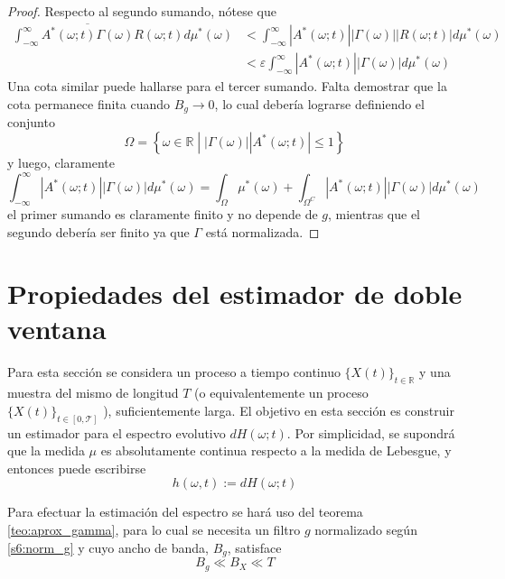 \documentclass[12pt,letterpaper]{book}
\newcommand{\R}{\mathbb{R}}
\newcommand{\intR}{\int_{-\infty}^{\infty}}
\newcommand{\abso}[1]{\left| #1 \right|}
\newcommand{\xtin}[1]{$\{X(t)\}_{t\in \mathcal{ #1 }}$ }
\newcommand{\talque}{\mathrel{}\middle|\mathrel{}}
\begin{document}
\begin{proof}
Respecto al segundo sumando, nótese que 
\begin{align*}
\intR \overline{A^{*}(\omega; t) \Gamma(\omega)} R(\omega; t) d\mu^{*}(\omega)
&< \intR \abso{A^{*}(\omega; t)} \abso{ \Gamma(\omega)} \abso{R(\omega; t)} d\mu^{*}(\omega) \\
&< \varepsilon \intR \abso{A^{*}(\omega; t)}\abso{ \Gamma(\omega)} d\mu^{*}(\omega)
\end{align*}
Una cota similar puede hallarse para el tercer sumando.
%
Falta demostrar que la cota permanece finita cuando $B_g \rightarrow 0$, lo cual debería lograrse definiendo el conjunto
\begin{equation}
\Omega = \left\{ \omega \in \R \talque \abso{\Gamma(\omega)} \abso{A^{*}(\omega; t)} \leq 1 \right\} 
\end{equation}
y luego, claramente
\begin{equation}
\intR \abso{A^{*}(\omega; t)}\abso{ \Gamma(\omega)} d\mu^{*}(\omega) = 
\int_\Omega \mu^{*}(\omega) + 
\int_{\Omega^{C}} \abso{A^{*}(\omega; t)}\abso{ \Gamma(\omega)} d\mu^{*}(\omega)
\end{equation}
el primer sumando es claramente finito y no depende de $g$, mientras que el segundo debería ser finito ya que $\Gamma$ está normalizada.
\end{proof}


\section{Propiedades del estimador de doble ventana}

Para esta sección se considera un proceso a tiempo continuo \xtin{\R} y una muestra del mismo de longitud $T$ (o equivalentemente un proceso \xtin{[0,T]}), suficientemente larga. El objetivo en esta sección es construir un estimador para el espectro evolutivo $dH(\omega; t)$.
%
Por simplicidad, se supondrá que la medida $\mu$ es absolutamente continua respecto a la medida de Lebesgue, y entonces puede escribirse
\begin{equation}
h(\omega,t) := dH(\omega; t)
\end{equation}

Para efectuar la estimación del espectro se hará uso del teorema \ref{teo:aprox_gamma}, para lo cual se necesita un filtro $g$ normalizado según \ref{s6:norm_g} y cuyo ancho de banda, $B_g$, satisface
\begin{equation}
B_g \ll B_X \ll T
\label{s6:anchos_banda}
\end{equation}
\end{document}
